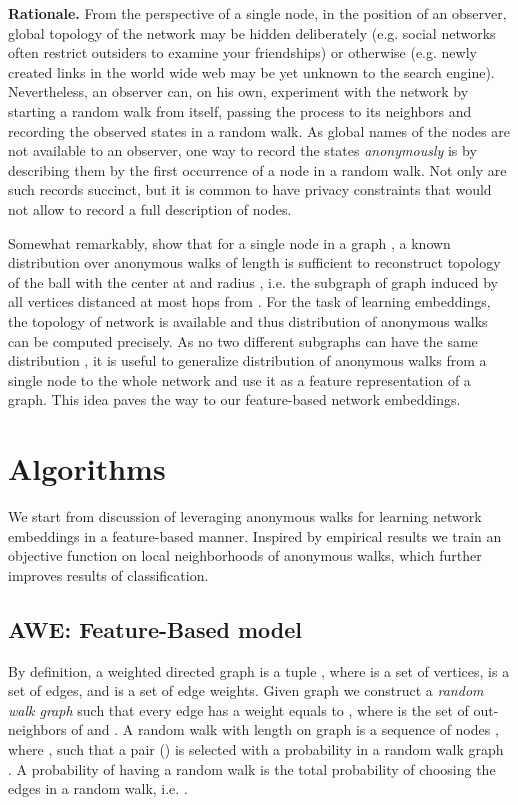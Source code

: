 \documentclass{article}
\theoremstyle{definition}
\begin{document}
\textbf{Rationale.} From the perspective of a single node, in the position of an observer, global topology of the network may be hidden deliberately (e.g. social networks often restrict outsiders to examine your friendships) or otherwise (e.g. newly created links in the world wide web may be yet unknown to the search engine). Nevertheless, an observer can, on his own, experiment with the network by starting a random walk from itself, passing the process to its neighbors and recording the observed states in a random walk. As global names of the nodes are not available to an observer, one way to record the states \textit{anonymously} is by describing them by the first occurrence of a node in a random walk. Not only are such records succinct, but it is common to have privacy constraints \cite{privacy} that would not allow to record a full description of nodes. 

Somewhat remarkably, \cite{anonymouswalks} show that for a single node  in a graph , a known distribution  over anonymous walks of length  is sufficient to reconstruct topology of the ball  with the center at  and radius , i.e. the subgraph of graph  induced by all vertices distanced at most  hops from . For the task of learning embeddings, the topology of network is available and thus distribution of anonymous walks  can be computed precisely. As no two different subgraphs can have the same distribution , it is useful to generalize distribution of anonymous walks from a single node to the whole network and use it as a feature representation of a graph. This idea paves the way to our feature-based network embeddings.

\section{Algorithms}
We start from discussion of leveraging anonymous walks for learning network embeddings in a feature-based manner. Inspired by empirical results we train an objective function on local neighborhoods of anonymous walks, which further improves results of classification. 
\subsection{AWE: Feature-Based model}

By definition, a weighted directed graph is a tuple , where  is a set of  vertices,  is a set of edges, and  is a set of edge weights. Given graph  we construct a \textit{random walk graph}  such that every edge  has a weight  equals to , where  is the set of out-neighbors of  and . A random walk  with length  on graph  is a sequence of nodes , where , such that a pair () is selected with a probability  in a random walk graph . A probability  of having a random walk  is the total probability of choosing the edges in a random walk, i.e. .
\end{document}
